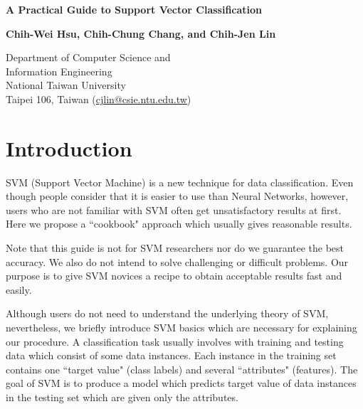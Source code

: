 \documentclass[12pt]{article}
\begin{document}
\setlength{\baselineskip}{18pt}
\begin{center}
{\Large\bf A Practical Guide to Support Vector Classification}

\bigskip

{\bf Chih-Wei Hsu, Chih-Chung Chang, and
 Chih-Jen Lin}\\
\medskip

Department of Computer Science and \\
Information Engineering \\
National Taiwan University \\
Taipei 106, Taiwan (\href{mailto:cjlin@csie.ntu.edu.tw}
{cjlin@csie.ntu.edu.tw})

\end{center}
\medskip


\begin{abstract}
Support vector machine (SVM) is a popular technique for 
classification. However, beginners who 
are not familiar with SVM often get 
unsatisfactory results since they miss some easy but 
significant steps. In this guide, we propose a 
simple procedure which usually gives reasonable results. 
\end{abstract}

\section{Introduction}
\label{intro}
SVM (Support Vector Machine) is a new technique for data
classification. Even though people consider that it is easier
to use than Neural Networks, however, users who are not 
familiar with SVM often get unsatisfactory results at first.
Here we propose a ``cookbook" approach which usually gives 
reasonable results. 

Note that this guide is not for SVM researchers nor do 
we guarantee the best accuracy. We also do not intend 
to solve challenging or difficult problems. Our purpose 
is to give SVM novices a recipe to obtain acceptable 
results fast and easily.

Although users do not need to understand the underlying 
theory of SVM, nevertheless, we briefly introduce SVM
basics which are necessary for explaining
our procedure. A classification task usually involves 
with training and testing data which 
consist of some data instances. Each instance in the  
training set contains one ``target value" (class labels) 
and several ``attributes" (features). 
The goal of SVM is to produce a model which 
predicts target value of data instances in the testing 
set which are given only the attributes.
\end{document}
